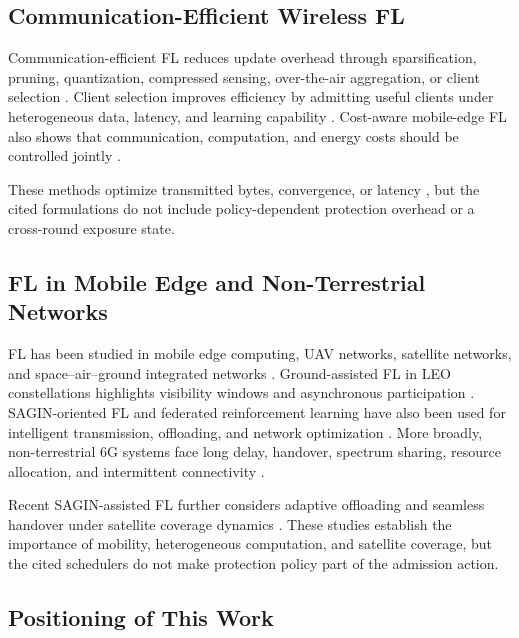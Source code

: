 \documentclass[preprint,12pt]{elsarticle}
\begin{document}
\subsection{Communication-Efficient Wireless FL}

Communication-efficient FL reduces update overhead through sparsification, pruning, quantization, compressed sensing, over-the-air aggregation, or client selection \cite{oh2023fedqcs,oh2024fedvqcs,liu2023adaptivequant,kim2023beamforming}. Client selection improves efficiency by admitting useful clients under heterogeneous data, latency, and learning capability \cite{oort2021oort,chen2024clientselection,dong2024aoi}. Cost-aware mobile-edge FL also shows that communication, computation, and energy costs should be controlled jointly \cite{luo2021costeffective}.

These methods optimize transmitted bytes, convergence, or latency \cite{oh2023fedqcs,liu2023adaptivequant,chen2024clientselection}, but the cited formulations do not include policy-dependent protection overhead or a cross-round exposure state.

\subsection{FL in Mobile Edge and Non-Terrestrial Networks}

FL has been studied in mobile edge computing, UAV networks, satellite networks, and space--air--ground integrated networks \cite{razmi2022ground,tang2023flsagin,qin2024dfrl}. Ground-assisted FL in LEO constellations highlights visibility windows and asynchronous participation \cite{razmi2022ground}. SAGIN-oriented FL and federated reinforcement learning have also been used for intelligent transmission, offloading, and network optimization \cite{tang2023flsagin,qin2024dfrl}. More broadly, non-terrestrial 6G systems face long delay, handover, spectrum sharing, resource allocation, and intermittent connectivity \cite{mahboob2024ntn,liu2018sagin}.

Recent SAGIN-assisted FL further considers adaptive offloading and seamless handover under satellite coverage dynamics \cite{han2024orchestrating}. These studies establish the importance of mobility, heterogeneous computation, and satellite coverage, but the cited schedulers do not make protection policy part of the admission action.

\subsection{Positioning of This Work}
\end{document}

